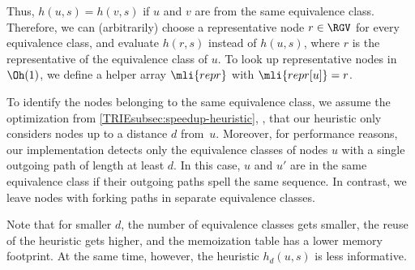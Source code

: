 Thus, $h(u,s)=h(v,s)$ if $u$ and $v$ are from the same equivalence class.
Therefore, we can (arbitrarily) choose a representative node $r \in \RGV$ for
every equivalence class, and evaluate $h(r,s)$ instead of $h(u,s)$, where $r$ is
the representative of the equivalence class of $u$. To look up representative
nodes in $\Oh(1)$, we define a helper array $\mli{repr}$ with $\mli{repr[u]} =
r$.

To identify the nodes belonging to the same equivalence class, we assume the
optimization from \cref{TRIEsubsec:speedup-heuristic}, \ie, that our heuristic only
considers nodes up to a distance $d$ from~$u$.
%
Moreover, for performance reasons, our implementation detects only the
equivalence classes of nodes $u$ with a single outgoing path of length at least
$d$.
%
In this case, $u$ and $u'$ are in the same equivalence class if their outgoing
paths spell the same sequence.
%
In contrast, we leave nodes with forking paths in separate equivalence classes.

Note that for smaller $d$, the number of equivalence classes gets smaller, the
reuse of the heuristic gets higher, and the memoization table has a lower memory
footprint. At the same time, however, the heuristic $h_d(u,s)$ is less
informative.
